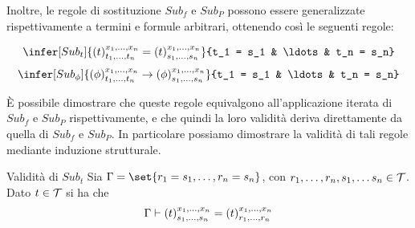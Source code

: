 \begin{prooftree}
\end{prooftree}

Inoltre, le regole di sostituzione \(Sub_f\) e \(Sub_P\) possono essere generalizzate rispettivamente a termini e formule arbitrari, ottenendo così le seguenti regole:

\[\infer[Sub_t]{\subs{t}{x_1,\ldots,x_n}{t_1,\ldots,t_n} = \subs{t}{x_1,\ldots,x_n}{s_1,\ldots,s_n}}{t_1 = s_1 & \ldots & t_n = s_n}\]
\[\infer[Sub_\phi]{\subs{\phi}{x_1,\ldots,x_n}{t_1,\ldots,t_n}\to\subs{\phi}{x_1,\ldots,x_n}{s_1,\ldots, s_n}}{t_1 = s_1 & \ldots & t_n = s_n}\]

È possibile dimostrare che queste regole equivalgono all'applicazione iterata di \(Sub_f\) e \(Sub_P\) rispettivamente, e che quindi la loro validità deriva direttamente da quella di \(Sub_f\) e \(Sub_P\). In particolare possiamo dimostrare la validità di tali regole mediante induzione strutturale.

\begin{proposition}{Validità di \(Sub_t\)}
  Sia \(\Gamma = \set{r_1 = s_1, \ldots, r_n = s_n}\), con \(r_1, \ldots, r_n, s_1,\ldots s_n \in \mathcal{T}\). Dato \(t \in \mathcal{T}\) si ha che
  \[\Gamma \vdash {{\left(t\right)}^{x_1,\ldots,x_n}_{s_1,\ldots,s_n}} = {{\left(t\right)}^{x_1,\ldots,x_n}_{r_1,\ldots,r_n}}\]
\end{proposition}


